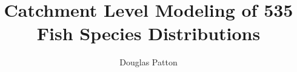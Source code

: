\documentclass[]{article}
\title{Catchment Level Modeling of 535 Fish Species Distributions}
\author{Douglas Patton}
\begin{document}
\maketitle

\begin{abstract}

\end{abstract}

\section{}
\end{document}
